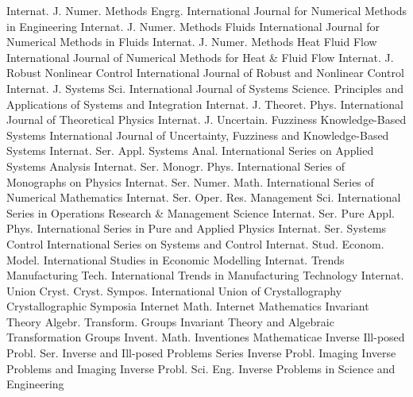 {Internat. J. Numer. Methods Engrg.}
{International Journal for Numerical Methods in Engineering}
{Internat. J. Numer. Methods Fluids}
{International Journal for Numerical Methods in Fluids}
{Internat. J. Numer. Methods Heat Fluid Flow}
{International Journal of Numerical Methods for Heat & Fluid Flow}
{Internat. J. Robust Nonlinear Control}
{International Journal of Robust and Nonlinear Control}
{Internat. J. Systems Sci.}
{International Journal of Systems Science. Principles and Applications of Systems and Integration}
{Internat. J. Theoret. Phys.}
{International Journal of Theoretical Physics}
{Internat. J. Uncertain. Fuzziness Knowledge-Based Systems}
{International Journal of Uncertainty, Fuzziness and Knowledge-Based Systems}
{Internat. Ser. Appl. Systems Anal.}
{International Series on Applied Systems Analysis}
{Internat. Ser. Monogr. Phys.}
{International Series of Monographs on Physics}
{Internat. Ser. Numer. Math.}
{International Series of Numerical Mathematics}
{Internat. Ser. Oper. Res. Management Sci.}
{International Series in Operations Research & Management Science}
{Internat. Ser. Pure Appl. Phys.}
{International Series in Pure and Applied Physics}
{Internat. Ser. Systems Control}
{International Series on Systems and Control}
{Internat. Stud. Econom. Model.}
{International Studies in Economic Modelling}
{Internat. Trends Manufacturing Tech.}
{International Trends in Manufacturing Technology}
{Internat. Union Cryst. Cryst. Sympos.}
{International Union of Crystallography Crystallographic Symposia}
{Internet Math.}
{Internet Mathematics}
{Invariant Theory Algebr. Transform. Groups}
{Invariant Theory and Algebraic Transformation Groups}
{Invent. Math.}
{Inventiones Mathematicae}
{Inverse Ill-posed Probl. Ser.}
{Inverse and Ill-posed Problems Series}
{Inverse Probl. Imaging}
{Inverse Problems and Imaging}
{Inverse Probl. Sci. Eng.}
{Inverse Problems in Science and Engineering}
